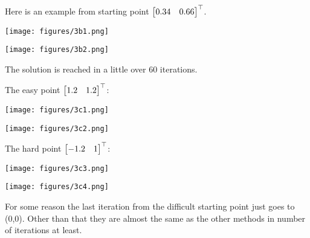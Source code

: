 
Here is an example from starting point $\begin{bmatrix} 0.34 & 0.66 \end{bmatrix}^{\top}$.

\begin{minipage}[c]{0.5\textwidth}
  \centering
  \texttt{[image: figures/3b1.png]}
\end{minipage}
\hfill
\begin{minipage}[c]{0.5\textwidth}
  \centering
  \texttt{[image: figures/3b2.png]}
\end{minipage}

The solution is reached in a little over 60 iterations. 


The easy point $\begin{bmatrix} 1.2 & 1.2 \end{bmatrix}^{\top}$:

\begin{minipage}[c]{0.5\textwidth}
  \centering
  \texttt{[image: figures/3c1.png]}
\end{minipage}
\hfill
\begin{minipage}[c]{0.5\textwidth}
  \centering
  \texttt{[image: figures/3c2.png]}
\end{minipage}

The hard point $\begin{bmatrix} -1.2 & 1 \end{bmatrix}^{\top}$:

\begin{minipage}[c]{0.5\textwidth}
  \centering
  \texttt{[image: figures/3c3.png]}
\end{minipage}
\hfill
\begin{minipage}[c]{0.5\textwidth}
  \centering
  \texttt{[image: figures/3c4.png]}
\end{minipage}

For some reason the last iteration from the difficult starting point just goes to (0,0). Other than that 
they are almost the same as the other methods in number of iterations at least. 
